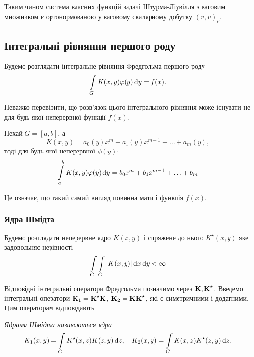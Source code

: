 Таким чином система власних функцій задачі Штурма-Ліувілля з ваговим множником є ортонормованою у ваговому скалярному добутку $(u, v)_\rho$.

\subsection{Інтегральні рівняння першого роду}

Будемо розглядати інтегральне рівняння Фредгольма першого роду
\begin{equation}
	\Int_G K(x, y) \phi(y) \diff y = f(x).
\end{equation}

Неважко перевірити, що розв'язок цього інтегрального рівняння може існувати не для будь-якої неперервної функції $f(x)$. 

\begin{example}
	Нехай $G=[a,b]$, а
	\begin{equation}
		K(x, y)=a_0(y)x^m+a_1(y)x^{m-1}+\ldots+a_m(y),
	\end{equation}
	тоді для будь-якої неперервної $\phi(y)$:
	\begin{equation}
		\Int_a^b K(x, y) \phi(y) \diff y = b_0x^m + b_1x^{m-1}+\ldots+b_m
	\end{equation}
	 
	Це означає, що такий самий вигляд повинна мати і функція $f(x)$.
\end{example}

\subsubsection{Ядра Шмідта}

Будемо розглядати неперервне ядро $K(x, y)$ і спряжене до нього $K^\star (x,y)$ яке задовольняє нерівності
\begin{equation}
	\Int_G\Int_G|K(x,y)|\diff x\diff y<\infty
\end{equation}

Відповідні інтегральні оператори Фредгольма позначимо через $\bf{K}, \bf{K}^\star $. Введемо інтегральні оператори $\bf{K}_1=\bf{K}^\star \bf{K}$, $\bf{K}_2=\bf{K}\bf{K}^\star $, які є симетричними і додатними. Цим операторам відповідають 

\begin{definition}
	\it{Ядрами Шмідта} називаються ядра
	\begin{equation}
		K_1(x, y) = \Int_G K^\star (x, z) K(z, y) \diff z, \quad K_2(x, y) = \Int_G K(x, z) K^\star (z, y) \diff z.
	\end{equation}
\end{definition}

